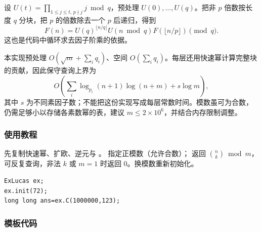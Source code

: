 设 $U(t)=\prod_{1\leq j\leq t,\,p\nmid j}j\bmod q$，预处理 $U(0),\ldots,U(q)$。把非 $p$ 倍数按长度 $q$ 分块，把 $p$ 的倍数除去一个 $p$ 后递归，得到
\[
    F(n)=U(q)^{\lfloor n/q\rfloor}U(n\bmod q)F(\lfloor n/p\rfloor)\pmod q.
\]
这也是代码中循环求去因子阶乘的依据。

本实现预处理 $O(\sqrt m+\sum_i q_i)$、空间 $O(\sum_i q_i)$。每层还用快速幂计算完整块的贡献，因此保守查询上界为
\[
    O\!\left(\sum_i\log_{p_i}(n+1)\log(n+m)+s\log m\right),
\]
其中 $s$ 为不同素因子数；不能把这份实现写成每层常数时间。模数虽可为合数，仍需足够小以存储各素数幂的表，建议 $m\leq2\times10^6$，并结合内存限制调整。

\subsubsection*{使用教程}
先复制快速幂、扩欧、逆元与 。 指定正模数（允许合数）； 返回 $\binom nk\bmod m$，可反复查询，非法 $k$ 或 $m=1$ 时返回 0。换模数重新初始化。
\begin{lstlisting}[style=mtycpp,numbers=none]
ExLucas ex;
ex.init(72);
long long ans=ex.C(1000000,123);
\end{lstlisting}

\subsubsection*{模板代码}
